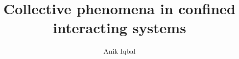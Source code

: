 

\abtitlepgfalse %
\abstractpgfalse %
\titlepgtrue   %
\copyrighttrue %
\signaturepagetrue %
\dedicationtrue %
\ackfalse %
\abswithesisfalse %
\tablecontentstrue %
\tablespagefalse %
\figurespagetrue %

\title{Collective phenomena in confined interacting systems} %

\author{Anik Iqbal} %


\newcommand{\dedication}
{ %
\begin{centering}
To my parents, my loving wife Farjana and my brother Asif
\end{centering}
	}

\beforepreface

\newpage
	\pagestyle{plain}
	\markboth{\thepage}{\thepage}
        \doublespace
\titleformat{\chapter}[display]   
{\normalfont\large\bfseries\centering}{\chaptertitlename\ \thechapter}{10pt}{\large}   
\titlespacing*{\chapter}{0pt}{-20pt}{25pt}
